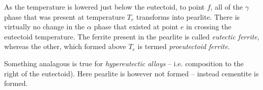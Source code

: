 As the temperature is lowered just below the eutectoid, to point $f$, all of the $\gamma$ phase that was present at temperature $T_e$ transforms into pearlite. There is virtually no change in the $\alpha$ phase that existed at point $e$ in crossing the eutectoid temperature. The ferrite present in the pearlite is called \textit{eutectic ferrite}, whereas the other, which formed above $T_e$ is termed \textit{proeutectoid ferrite}. 

Something analagous is true for \textit{hypereutectic alloys} -- i.e. composition to the right of the eutectoid). Here pearlite is however not formed -- instead cementite is formed. 
